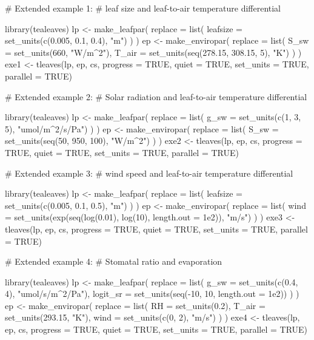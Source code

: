 \documentclass[11pt, oneside]{article}
\begin{document}
\begin{Schunk}
\begin{Sinput}
 # Extended example 1: 
 # leaf size and leaf-to-air temperature differential
 
 library(tealeaves)
 lp  <- make_leafpar(
   replace = list(
     leafsize = set_units(c(0.005, 0.1, 0.4), "m")
   )
 )
 ep <- make_enviropar(
   replace = list(
     S_sw = set_units(660, "W/m^2"),
     T_air = set_units(seq(278.15, 308.15, 5), "K")
   )
 )
 exe1 <- tleaves(lp, ep, cs, progress = TRUE, quiet = TRUE, 
                 set_units = TRUE, parallel = TRUE)
 
\end{Sinput}
\end{Schunk}

\clearpage

\begin{Schunk}
\begin{Sinput}
 # Extended example 2: 
 # Solar radiation and leaf-to-air temperature differential
 
 library(tealeaves)
 lp  <- make_leafpar(
   replace = list(
     g_sw = set_units(c(1, 3, 5), "umol/m^2/s/Pa")
   )
 )
 ep <- make_enviropar(
   replace = list(
     S_sw = set_units(seq(50, 950, 100), "W/m^2")
   )
 )
 exe2 <- tleaves(lp, ep, cs, progress = TRUE, quiet = TRUE, 
                 set_units = TRUE, parallel = TRUE)
 
\end{Sinput}
\end{Schunk}

\clearpage

\begin{Schunk}
\begin{Sinput}
 # Extended example 3: 
 # wind speed and leaf-to-air temperature differential
 
 library(tealeaves)
 lp  <- make_leafpar(
   replace = list(
     leafsize = set_units(c(0.005, 0.1, 0.5), "m")
   )
 )
 ep <- make_enviropar(
   replace = list(
     wind = set_units(exp(seq(log(0.01), log(10), 
                              length.out = 1e2)), "m/s")
   )
 )
 exe3 <- tleaves(lp, ep, cs, progress = TRUE, quiet = TRUE, 
                 set_units = TRUE, parallel = TRUE)
\end{Sinput}
\end{Schunk}

\clearpage

\begin{Schunk}
\begin{Sinput}
 # Extended example 4: 
 # Stomatal ratio and evaporation
 
 library(tealeaves)
 lp  <- make_leafpar(
   replace = list(
     g_sw = set_units(c(0.4, 4), "umol/s/m^2/Pa"),
     logit_sr = set_units(seq(-10, 10, length.out = 1e2))
   )
 )
 ep <- make_enviropar(
   replace = list(
     RH = set_units(0.2),
     T_air = set_units(293.15, "K"),
     wind = set_units(c(0, 2), "m/s")
   )
 )
 exe4 <- tleaves(lp, ep, cs, progress = TRUE, quiet = TRUE, 
                 set_units = TRUE, parallel = TRUE)
 
\end{Sinput}
\end{Schunk}
\end{document}
